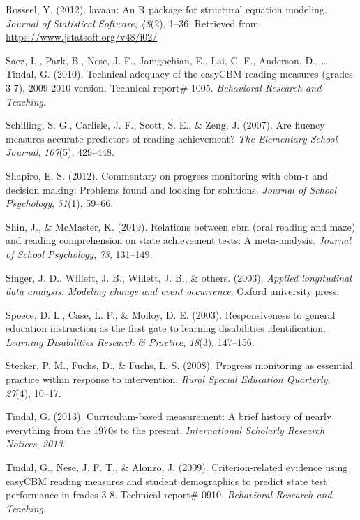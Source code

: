 \documentclass[
  english,
  man, fleqn, noextraspace]{apa6}
\begin{document}
\leavevmode\hypertarget{ref-R-lavaan}{}%
Rosseel, Y. (2012). lavaan: An R package for structural equation modeling. \emph{Journal of Statistical Software}, \emph{48}(2), 1--36. Retrieved from \url{https://www.jstatsoft.org/v48/i02/}

\leavevmode\hypertarget{ref-saez2010tech}{}%
Saez, L., Park, B., Nese, J. F., Jamgochian, E., Lai, C.-F., Anderson, D., \ldots{} Tindal, G. (2010). Technical adequacy of the easyCBM reading measures (grades 3-7), 2009-2010 version. Technical report\# 1005. \emph{Behavioral Research and Teaching}.

\leavevmode\hypertarget{ref-schilling2007}{}%
Schilling, S. G., Carlisle, J. F., Scott, S. E., \& Zeng, J. (2007). Are fluency measures accurate predictors of reading achievement? \emph{The Elementary School Journal}, \emph{107}(5), 429--448.

\leavevmode\hypertarget{ref-shapiro2012}{}%
Shapiro, E. S. (2012). Commentary on progress monitoring with cbm-r and decision making: Problems found and looking for solutions. \emph{Journal of School Psychology}, \emph{51}(1), 59--66.

\leavevmode\hypertarget{ref-shin2019}{}%
Shin, J., \& McMaster, K. (2019). Relations between cbm (oral reading and maze) and reading comprehension on state achievement tests: A meta-analysis. \emph{Journal of School Psychology}, \emph{73}, 131--149.

\leavevmode\hypertarget{ref-singerwillett2003}{}%
Singer, J. D., Willett, J. B., Willett, J. B., \& others. (2003). \emph{Applied longitudinal data analysis: Modeling change and event occurrence}. Oxford university press.

\leavevmode\hypertarget{ref-speece2003}{}%
Speece, D. L., Case, L. P., \& Molloy, D. E. (2003). Responsiveness to general education instruction as the first gate to learning disabilities identification. \emph{Learning Disabilities Research \& Practice}, \emph{18}(3), 147--156.

\leavevmode\hypertarget{ref-stecker2008}{}%
Stecker, P. M., Fuchs, D., \& Fuchs, L. S. (2008). Progress monitoring as essential practice within response to intervention. \emph{Rural Special Education Quarterly}, \emph{27}(4), 10--17.

\leavevmode\hypertarget{ref-tindal2013}{}%
Tindal, G. (2013). Curriculum-based measurement: A brief history of nearly everything from the 1970s to the present. \emph{International Scholarly Research Notices}, \emph{2013}.

\leavevmode\hypertarget{ref-tindal2009}{}%
Tindal, G., Nese, J. F. T., \& Alonzo, J. (2009). Criterion-related evidence using easyCBM reading measures and student demographics to predict state test performance in frades 3-8. Technical report\# 0910. \emph{Behavioral Research and Teaching}.
\end{document}
